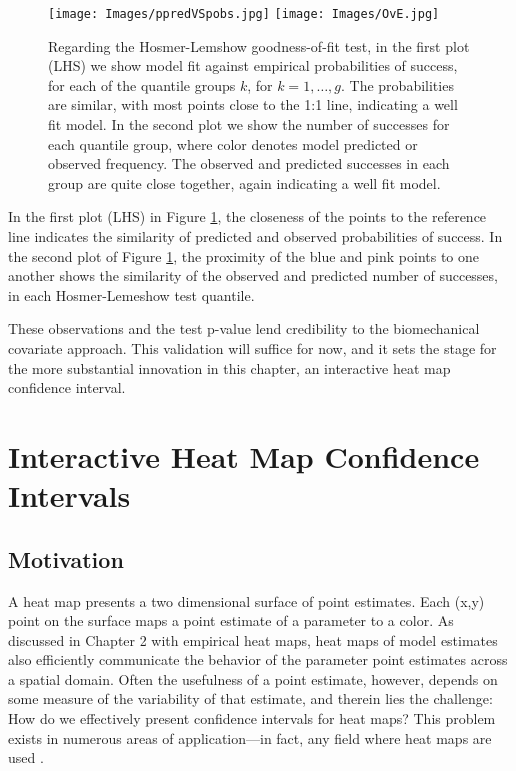   \begin{figure}[!ht]
    \centering
    \texttt{[image: Images/ppredVSpobs.jpg]}
    \texttt{[image: Images/OvE.jpg]}
    \caption{Regarding the Hosmer-Lemshow goodness-of-fit test, in the first plot (LHS) we show model fit against empirical probabilities of success, for each of the quantile groups $k$, for $k = 1, \dots, g$. The probabilities are similar, with most points close to the 1:1 line, indicating a well fit model. In the second plot we show the number of successes for each quantile group, where color denotes model predicted or observed frequency. The observed and predicted successes in each group are quite close together, again indicating a well fit model.}
    \label{fig:hoslem}
  \end{figure}
In the first plot (LHS) in Figure \ref{fig:hoslem}, the closeness of the points to the reference line indicates the similarity of predicted and observed probabilities of success. In the second plot of Figure \ref{fig:hoslem}, the proximity of the blue and pink points to one another shows the similarity of the observed and predicted number of successes, in each Hosmer-Lemeshow test quantile. 

These observations and the test p-value lend credibility to the biomechanical covariate approach. This validation will suffice for now, and it sets the stage for the more substantial innovation in this chapter, an interactive heat map confidence interval.

\section{Interactive Heat Map Confidence Intervals}

\subsection{Motivation}

A heat map presents a two dimensional surface of point estimates. Each (x,y) point on the surface maps a point estimate of a parameter to a color. As discussed in Chapter 2 with empirical heat maps, heat maps of model estimates also efficiently communicate the behavior of the parameter point estimates across a spatial domain. Often the usefulness of a point estimate, however, depends on some measure of the variability of that estimate, and therein lies the challenge: How do we effectively present confidence intervals for heat maps? This problem exists in numerous areas of application---in fact, any field where heat maps are used \citep{Emerson}. 

